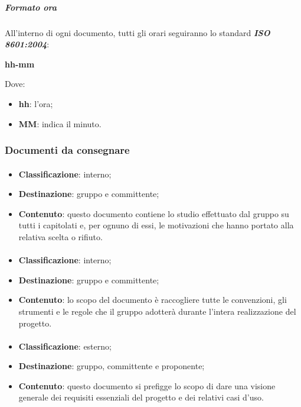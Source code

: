 			\subparagraph{Formato ora}
			All'interno di ogni documento, tutti gli orari seguiranno lo standard \textit{\textbf{ISO 8601:2004}}:
			\begin{center}
				\textbf{hh-mm}
			\end{center}
			Dove:
			\begin{itemize}
				\item \textbf{hh}: l'ora;
				\item \textbf{MM}: indica il minuto.
			\end{itemize}
		
		\subsubsection{Documenti da consegnare}
			\paragraph{\SdF}
			\begin{itemize}
				\item \textbf{Classificazione}: interno;
				\item \textbf{Destinazione}: gruppo e committente;
				\item \textbf{Contenuto}: questo documento contiene lo studio effettuato dal gruppo \textit{\gruppo} su tutti i capitolati e, per ognuno di essi, le motivazioni che hanno portato alla relativa scelta o rifiuto.
			\end{itemize}

			\paragraph{\NdP}
			\begin{itemize}
				\item \textbf{Classificazione}: interno;
				\item \textbf{Destinazione}: gruppo e committente;
				\item \textbf{Contenuto}: lo scopo del documento è raccogliere tutte le convenzioni, gli strumenti e le regole che il gruppo \textit{\gruppo} adotterà durante l'intera realizzazione del progetto. 
			\end{itemize}	

			\paragraph{\AdR}
			\begin{itemize}
				\item \textbf{Classificazione}: esterno;
				\item \textbf{Destinazione}: gruppo, committente e proponente;
				\item \textbf{Contenuto}: questo documento si prefigge lo scopo di dare una visione generale dei requisiti essenziali del progetto e dei relativi casi d'uso.
			\end{itemize}

